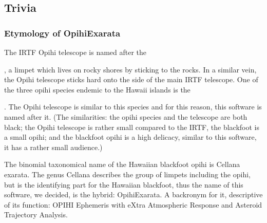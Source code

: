 \documentclass[letterpaper,11pt,english]{sphinxmanual}
\begin{document}
\sphinxstepscope


\subsection{Trivia}
\label{\detokenize{user/trivia:trivia}}\label{\detokenize{user/trivia::doc}}

\subsubsection{Etymology of OpihiExarata}
\label{\detokenize{user/trivia:etymology-of-opihiexarata}}
\sphinxAtStartPar
The IRTF Opihi telescope is named after the %
\begin{footnote}[24]\sphinxAtStartFootnote
{}
%
\end{footnote}, a limpet which lives on
rocky shores by sticking to the rocks. In a similar vein, the Opihi telescope
sticks hard onto the side of the main IRTF telescope. One of the three opihi
species endemic to the Hawaii islands is the %
\begin{footnote}[25]\sphinxAtStartFootnote
{}
%
\end{footnote}. The
Opihi telescope is similar to this species and for this reason, this software
is named after it. (The similarities: the opihi species and the telescope are
both black; the Opihi telescope is rather small compared to the IRTF, the
blackfoot is a small opihi; and the blackfoot opihi is a high delicacy,
similar to this software, it has a rather small audience.)

\sphinxAtStartPar
The binomial taxonomical name of the Hawaiian blackfoot opihi is Cellana
exarata. The genus Cellana describes the group of limpets including the opihi,
but  is the identifying part for the Hawaiian blackfoot, thus the
name of this software, we decided, is the hybrid: OpihiExarata. A backronym for
it, descriptive of its function: OPIHI Ephemeris with eXtra Atmospheric
Response and Asteroid Trajectory Analysis.
\end{document}
